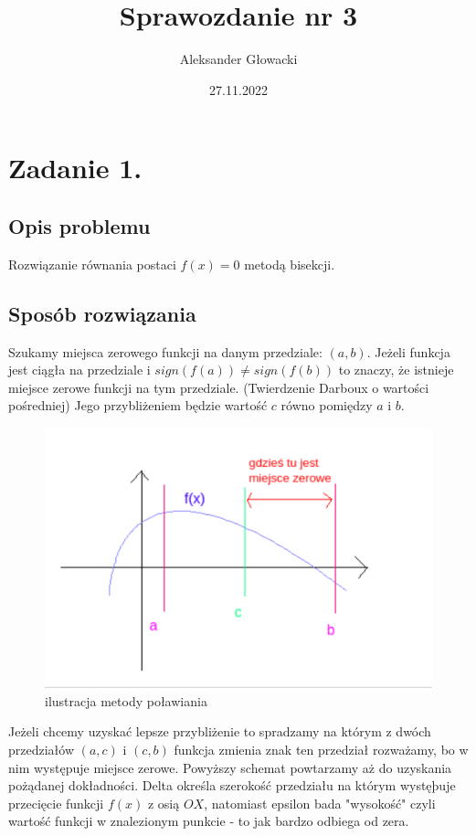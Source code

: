 \documentclass[12pt]{article}
\author{Aleksander Głowacki}
\title{Sprawozdanie nr 3}
\date{27.11.2022}
\begin{document}
\maketitle

\tableofcontents

\section{Zadanie 1.}


\subsection{Opis problemu}
Rozwiązanie równania postaci $ f(x) = 0 $ metodą bisekcji.

\subsection{Sposób rozwiązania}
Szukamy miejsca zerowego funkcji na danym przedziale: $(a,b)$. \newline Jeżeli funkcja
jest ciągła na przedziale i $sign(f(a)) \neq sign(f(b))$ to znaczy, że istnieje 
miejsce zerowe funkcji na tym przedziale. (Twierdzenie Darboux o wartości pośredniej)\newline
Jego przybliżeniem będzie wartość $c$ równo pomiędzy $a$ i $b$.\newline
\begin{figure}[h]
    \caption{ilustracja metody poławiania}
    \centering
    \includegraphics[width=12cm]{polawianie.png}
\end{figure}
Jeżeli chcemy uzyskać lepsze przybliżenie to spradzamy na którym z dwóch 
przedziałów $(a,c)$ i $(c,b)$ funkcja zmienia znak ten przedział rozważamy, bo w nim występuje miejsce zerowe.
\newline Powyższy schemat powtarzamy aż do uzyskania pożądanej dokładności.
Delta określa szerokość przedziału na którym wystęþuje przecięcie funkcji $f(x)$ 
z osią $OX$, natomiast epsilon bada "wysokość" czyli wartość funkcji w znalezionym punkcie - to 
jak bardzo odbiega od zera.
\end{document}
